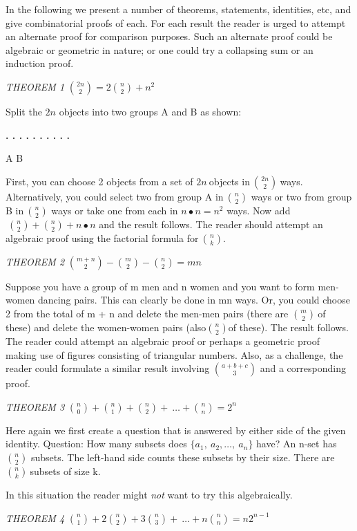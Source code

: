 \documentclass[10pt,letter]{article}
\begin{document}
In the following we present a number of theorems, statements,
identities, etc, and give combinatorial proofs of each. For each result
the reader is urged to attempt an alternate proof for comparison
purposes. Such an alternate proof could be algebraic or geometric in
nature; or one could try a collapsing sum or an induction proof.

\emph{THEOREM 1} \(\binom{2n}{2}
 = 2
\binom{n}{2}
 + n^{2}\)

Split the \(2n\) objects into two groups A and B as shown:

\textbf{. . . . . . . . . . }

A B

First, you can choose 2 objects from a set of \(2n\ \)objects
in\(\
\binom{2n}{2}
\ \)ways. Alternatively, you could select two from group A
in\(\
\binom{n}{2}
\) ways or two from group B in\(\
\binom{n}{2}
\) ways or take one from each in \(n \bullet n = n^{2}\)
ways. Now add\(\
\binom{n}{2}
 +
\binom{n}{2}
 + n \bullet n\) and the result follows. The reader should
attempt an algebraic proof using the factorial formula
for\(\
\binom{n}{k}
\).

\emph{THEOREM 2} \(\binom{m + n}{2}
 -
\binom{m}{2}
 -
\binom{n}{2}
 = mn\)

Suppose you have a group of m men and n women and you want to form
men-women dancing pairs. This can clearly be done in mn ways. Or, you
could choose 2 from the total of m + n and delete the men-men pairs
(there are \(\binom{m}{2}
\ \)of these) and delete the women-women pairs
(also\(\binom{n}{2}
\)of these). The result follows. The reader could attempt
an algebraic proof or perhaps a geometric proof making use of figures
consisting of triangular numbers. Also, as a challenge, the reader could
formulate a similar result involving \(\binom{a + b + c}{3}
\) and a corresponding proof.

\emph{THEOREM 3} \(\binom{n}{0}
 +
\binom{n}{1}
 +
\binom{n}{2}
 + \ \ldots +
\binom{n}{n}
 = 2^{n}\)

Here again we first create a question that is answered by either side of
the given identity. Question: How many subsets does
\(\{ a_{1},\ a_{2},\ldots,\ a_{n}\}\) have? An n-set has
\(\binom{n}{2}
\) subsets. The left-hand side counts these subsets by
their size. There are \(\binom{n}{k}
\ \)subsets of size k.

In this situation the reader might \emph{not} want to try this
algebraically.

\emph{THEOREM 4} \(\binom{n}{1}
 + 2
\binom{n}{2}
 + 3
\binom{n}{3}
 + \ \ldots + n
\binom{n}{n}
 = {n2}^{n - 1}\)
\end{document}
